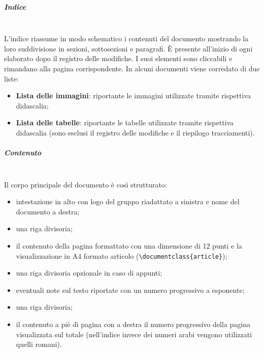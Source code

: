            \subparagraph{Indice}\mbox{}\\ [1mm]
                L'indice riassume in modo schematico i contenuti del documento mostrando la loro suddivisione in sezioni, sottosezioni e paragrafi.
                È presente all'inizio di ogni elaborato dopo il registro delle modifiche. I suoi elementi sono cliccabili e rimandano alla pagina
                corrispondente. In alcuni documenti viene corredato di due liste:
                \begin{itemize}
                    \item \textbf{Lista delle immagini}: riportante le immagini utilizzate tramite rispettiva didascalia;
                    \item \textbf{Lista delle tabelle}: riportante le tabelle utilizzate tramite rispettiva didascalia (sono esclusi il registro delle modifiche
                                                        e il riepilogo tracciamenti).
                \end{itemize}
            \subparagraph{Contenuto}\mbox{}\\ [1mm]
                Il corpo principale del documento è così strutturato:
                \begin{itemize}
                    \item intestazione in alto con logo del gruppo riadattato a sinistra e nome del documento a destra;
                    \item una riga divisoria;
                    \item il contenuto della pagina formattato con una dimensione di 12 punti e la visualizzazione in A4 formato articolo
                          (\verb|\documentclass{article}|);
                    \item una riga divisoria opzionale in caso di appunti;
                    \item eventuali note sul testo riportate con un numero progressivo a esponente;
                    \item una riga divisoria;
                    \item il contenuto a piè di pagina con a destra il numero progressivo della pagina visualizzata sul totale (nell'indice invece dei numeri
                          arabi vengono utilizzati quelli romani).
                \end{itemize}
